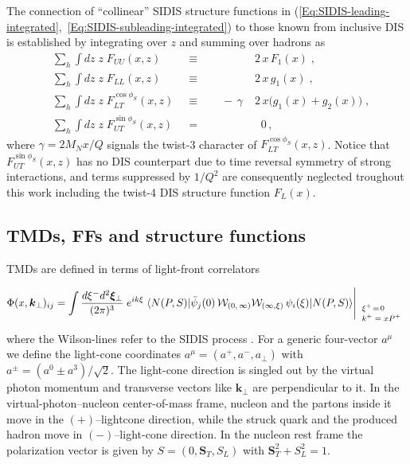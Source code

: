 \documentclass[a4paper,11pt]{article}
\newcommand{\be}{\begin{equation}}
\newcommand{\ee}{\end{equation}}
\newcommand{\la}{\langle}
\newcommand{\ra}{\rangle}
\newcommand{\with}[3]{{\Biggl|{\renewcommand*{\arraystretch}{0.8}
	\begin{array}{l} 
	\phantom{X}\\
	\mbox{\scriptsize ${#1}$}\\
	\mbox{\scriptsize ${#2}$}\\
	\mbox{\scriptsize #3}\end{array}}}}
\newcommand{\orange}[1]{{\color{orange} #1}}
\newcommand{\ak}[1]{\orange{ #1}}
\def\bfkperp{{\bm k}_\perp}
\begin{document}
The connection of ``collinear'' SIDIS structure functions
in (\ref{Eq:SIDIS-leading-integrated},~\ref{Eq:SIDIS-subleading-integrated})
to those known from inclusive DIS is established by integrating over $z$
and summing over hadrons as 
\begin{subequations}\begin{alignat}{4}
	&\sum\limits_h\int d z\;z\;F_{UU}(x,z) 
	&\equiv	&&	& 2\,x\,F_1(x) \;, 
	\label{Eq:DIS-F1}\\ %
	&\sum\limits_h\int d z\;z\;F_{LL}(x,z) 
	&\equiv && 	& 2\,x\,g_1(x) \;, 
	\label{Eq:DIS-g1}\\ %
	&\sum\limits_h\int d z\;z\;F_{LT}^{\cos\phi_S}(x,z) \;\;
	&\equiv && \;\; -\,\gamma\; & 2\,x\biggl(g_1(x)+g_2(x)\biggr) \;, 
	\label{Eq:DIS-gT}\\ %
	&\sum\limits_h\int d z\;z\;F_{UT}^{\sin\phi_S}(x,z) 
	&=      && 	    & \;\; 0 \, ,
	\label{Eq:DIS-zero}
\end{alignat}\end{subequations}
where $\gamma=2M_Nx/Q$ signals the twist-3 character of $F_{LT}^{\cos\phi_S}(x,z)$.
Notice that $F_{UT}^{\sin\phi_S}(x,z)$ has no DIS counterpart due to time reversal
symmetry of strong interactions, and \ak{terms suppressed by $1/Q^2$ are 
consequently neglected troughout this work including the twist-4 DIS 
structure function $F_L(x)$. }


\subsection{TMDs, FFs and structure functions}
\label{Sec-2.2:def-TMD-FF}

TMDs are defined in terms of light-front correlators
\be\label{Eq:correlator}
    	\Phi(x,\bfkperp)_{ij} = \int\frac{ d \xi^- d^2{\bm \xi}_\perp}{(2\pi)^3}
	\;e^{ik\xi}\;\la N(P,S)|\bar\psi_j(0)\,{\cal W}_{(0,\,\infty)}
	{\cal W}_{(\infty,\xi)}\,\psi_i(\xi)|N(P,S)\ra
    	\with{ }{\xi^+\!=\!0}{$k^+ = xP^+$}
	\ee
where the Wilson-lines refer to the SIDIS process 
\cite{Collins:2002kn}. For a generic four-vector $a^\mu$ we define
the light-cone coordinates $a^\mu=(a^+,a^-,a_\perp)$ with 
$a^\pm=(a^0\pm a^3)/\sqrt{2}$. 
The light-cone direction is singled out by the virtual photon momentum 
and transverse vectors like $\bfkperp$ are perpendicular to it. In the
virtual-photon--nucleon center-of-mass frame, nucleon and the partons 
inside it move in the $(+)$--lightcone direction, while the struck 
quark and the produced hadron move in $(-)$--light-cone direction.
In the nucleon rest frame the polarization vector is given by 
$S=(0,{\bm S}_T,S_L)$ with ${\bm S}_T^2+S_L^2=1$.
\end{document}
